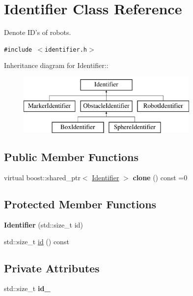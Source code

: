\hypertarget{class_identifier}{
\section{Identifier Class Reference}
\label{class_identifier}
}
Denote ID's of robots.  


{\tt \#include $<$identifier.h$>$}

Inheritance diagram for Identifier::\begin{figure}[H]
\begin{center}
\leavevmode
\includegraphics[height=3cm]{class_identifier}
\end{center}
\end{figure}
\subsection*{Public Member Functions}
\begin{CompactItemize}
\item 
\hypertarget{class_identifier_1f3dc42a16ac34879e694cca9cda3c00}{
virtual boost::shared\_\-ptr$<$ \hyperlink{class_identifier}{Identifier} $>$ \textbf{clone} () const =0}
\label{class_identifier_1f3dc42a16ac34879e694cca9cda3c00}

\end{CompactItemize}
\subsection*{Protected Member Functions}
\begin{CompactItemize}
\item 
\hypertarget{class_identifier_d5b9459c4949aa660a8823cc99e25bf1}{
\textbf{Identifier} (std::size\_\-t id)}
\label{class_identifier_d5b9459c4949aa660a8823cc99e25bf1}

\item 
std::size\_\-t \hyperlink{class_identifier_b60899833fdfebb88f78ecf4c71a2f78}{id} () const 
\end{CompactItemize}
\subsection*{Private Attributes}
\begin{CompactItemize}
\item 
\hypertarget{class_identifier_fb77402eef7f10eeb2a3f4251390a007}{
std::size\_\-t \textbf{id\_\-}}
\label{class_identifier_fb77402eef7f10eeb2a3f4251390a007}

\end{CompactItemize}
